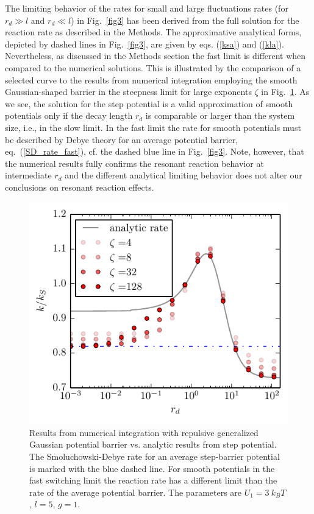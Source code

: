\documentclass[preprint,superscriptaddress]{revtex4-1}
\begin{document}
The limiting behavior of the rates for small and large fluctuations rates (for $r_d\gg l $ and $r_d \ll l$) in Fig.~\ref{fig3} has been derived from the full solution 
for the reaction rate as described in the Methods. The approximative analytical forms, depicted by dashed lines in Fig.~\ref{fig3},  are given by eqs. (\ref{ksa}) and (\ref{kla}).   Nevertheless, as discussed in the Methods section the fast limit is different when compared to the numerical solutions. 
This is illustrated by the comparison of a selected curve to the results from numerical integration employing the smooth Gaussian-shaped barrier in the steepness limit for large exponents $\zeta$ in Fig.~\ref{fig:limit}. As we see, the solution for the step potential is a valid approximation of smooth potentials only if the decay length $r_d$ is comparable or larger than the system size, i.e., in the slow limit.  In the fast limit the rate for smooth potentials 
must  be described by Debye theory for an average potential barrier, eq.~(\ref{SD_rate_fast}), cf. the dashed 
blue line in Fig.~\ref{fig3}. Note, however, that the numerical results fully confirms the resonant reaction behavior at
intermediate $r_d$ and the different analytical limiting behavior does not alter our conclusions on resonant reaction effects.

\begin{figure}[H]
\begin{center}
    \includegraphics[width= 0.4 \textwidth]{plots/conv_symmetric.pdf}
    \caption{Results from numerical integration with repulsive generalized Gaussian potential barrier vs. analytic results from step potential. 
    The Smoluchowski-Debye rate for an average step-barrier potential is marked with the blue dashed line. 
    For smooth potentials in the fast switching limit the reaction rate has a different limit than the rate of the  
    average potential barrier. The parameters are $U_1 = 3 ~k_B T$, $l=5$, $g=1$. }
\label{fig:limit}
\end{center}
\end{figure}
\end{document}
